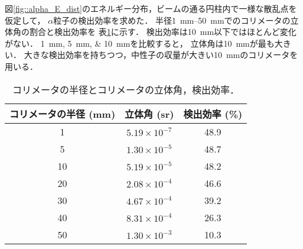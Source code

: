 \documentclass[../master]{subfiles}
\begin{document}
図\ref{fig::alpha_E_dist}のエネルギー分布，ビームの通る円柱内で一様な散乱点を仮定して，
$\alpha$粒子の検出効率を求めた．
半径\SIrange{1}{50}{\milli\metre}でのコリメータの立体角の割合と検出効率を
表\ref{tab::solid_angle_percent}に示す．
検出効率は\SI{10}{\milli\metre}以下ではほとんど変化がない．
\SIlist{1;5;10}{\milli\metre}を比較すると，
立体角は\SI{10}{\milli\metre}が最も大きい．
大きな検出効率を持ちつつ，中性子の収量が大きい\SI{10}{\milli\metre}のコリメータを用いる．
\begin{table}
  \centering
  \caption{コリメータの半径とコリメータの立体角，検出効率．}
  \label{tab::solid_angle_percent}
  \begin{tabular}{ccc}
    \toprule
    コリメータの半径 (\si{\milli\metre}) & 立体角 (\si{\steradian}) & 検出効率 (\si{\percent})\\%
    \midrule
     1 & $5.19\times10^{-7}$ & 48.9 \\
     5 & $1.30\times10^{-5}$ & 48.7 \\%
    10 & $5.19\times10^{-5}$ & 48.2 \\%
    20 & $2.08\times10^{-4}$ & 46.6 \\%
    30 & $4.67\times10^{-4}$ & 39.2 \\%
    40 & $8.31\times10^{-4}$ & 26.3 \\%
    50 & $1.30\times10^{-3}$ & 10.3 \\%
    \bottomrule
  \end{tabular}
\end{table}
\end{document}
